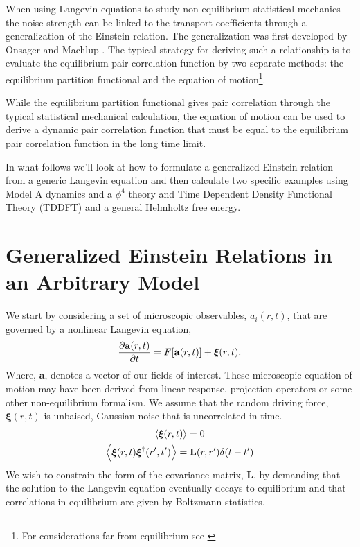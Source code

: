 When using Langevin equations to study non-equilibrium statistical mechanics
the noise strength can be linked to the transport coefficients through a
generalization of the Einstein relation. The generalization was first developed
by Onsager and Machlup \cite{OnsagerMachlup}. The typical strategy for deriving
such a relationship is to evaluate the equilibrium pair correlation function by
two separate methods: the equilibrium partition functional and the equation of
motion\footnote{For considerations far from equilibrium see \cite{Lax, Ronis,
Fox_and_Uhlenbeck}}.

While the equilibrium partition functional gives pair correlation through the
typical statistical mechanical calculation, the equation of motion can be used
to derive a dynamic pair correlation function that must be equal to the
equilibrium pair correlation function in the long time limit.

In what follows we'll look at how to formulate a generalized Einstein relation
from a generic Langevin equation and then calculate two specific examples using
Model A dynamics and a $\phi^4$ theory and Time Dependent Density Functional
Theory (TDDFT) and a general Helmholtz free energy.

\section{Generalized Einstein Relations in an Arbitrary Model}

We start by considering a set of microscopic observables, $a_i(r, t)$, that are
governed by a nonlinear Langevin equation,
%
\begin{equation} \frac{\partial \mathbf{a}(r, t)}{\partial t} = F[\mathbf{a}(r,t)]
+ \boldsymbol{\xi}(r,t).  \end{equation}
%
Where, $\mathbf{a}$, denotes a vector of our fields of interest. These
microscopic equation of motion may have been derived from linear response,
projection operators or some other non-equilibrium formalism. We assume that
the random driving force, $\boldsymbol{\xi}(r, t)$ is unbaised, Gaussian noise
that is uncorrelated in time.
%
\begin{gather} \left\langle \boldsymbol{\xi}(r,t)\right\rangle = 0 \\ \left\langle
\boldsymbol{\xi}(r,t)\boldsymbol{\xi}^\dagger(r^\prime,t^\prime)\right\rangle =
\mathbf{L}(r, r^\prime)\delta(t-t^\prime) \end{gather}
%
We wish to constrain the form of the covariance matrix, $\mathbf{L}$, by
demanding that the solution to the Langevin equation eventually decays to
equilibrium and that correlations in equilibrium are given by Boltzmann
statistics.

